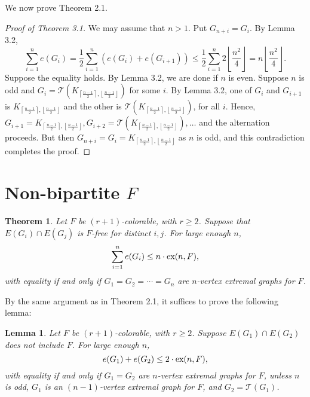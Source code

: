 \documentclass[12pt]{report}
\newtheorem{theorem}{Theorem}[chapter]
\newtheorem{lemma}{Lemma}[theorem]
\begin{document}
We now prove Theorem 2.1.

\begin{proof}[Proof of Theorem 3.1]
  We may assume that $n > 1$. Put $G_{n + i} = G_i$. By Lemma 3.2,
  \[
    \sum_{i = 1}^n e(G_i) = \frac{1}{2}\sum_{i = 1}^n (e(G_i) + e(G_{i + 1})) \leq \frac{1}{2}\sum_{i = 1}^n 2\left\lfloor\frac{n^2}{4}\right\rfloor = n\left\lfloor\frac{n^2}{4}\right\rfloor.
  \]
  Suppose the equality holds. By Lemma 3.2, we are done if $n$ is even. Suppose $n$ is odd and $G_i
   = \mathcal{T}(K_{\left\lceil\frac{n - 1}{2}\right\rceil, \left\lfloor\frac{n -
   1}{2}\right\rfloor})$ for some $i$. By Lemma 3.2, one of $G_i$ and $G_{i + 1}$ is
   $K_{\left\lceil\frac{n - 1}{2}\right\rceil, \left\lfloor\frac{n - 1}{2}\right\rfloor}$ and the
   other is $\mathcal{T}(K_{\left\lceil\frac{n - 1}{2}\right\rceil, \left\lfloor\frac{n -
   1}{2}\right\rfloor})$, for all $i$. Hence, $G_{i + 1} = K_{\left\lceil\frac{n -
   1}{2}\right\rceil, \left\lfloor\frac{n - 1}{2}\right\rfloor}, G_{i + 2} =
   \mathcal{T}(K_{\left\lceil\frac{n - 1}{2}\right\rceil, \left\lfloor\frac{n -
   1}{2}\right\rfloor}), \ldots$ and the alternation proceeds. But then $G_{n + i} = G_i =
   K_{\left\lceil\frac{n - 1}{2}\right\rceil, \left\lfloor\frac{n - 1}{2}\right\rfloor}$ as $n$ is
   odd, and this contradiction completes the proof.
\end{proof}

\section{Non-bipartite $F$}

\begin{theorem}
  Let $F$ be $(r + 1)$-colorable, with $r \geq 2$. Suppose that $E(G_i) \cap E(G_j)$ is $F$-free for
  distinct $i, j$. For large enough $n$,
  \[
    \sum_{i = 1}^n e(G_i) \leq n \cdot \textnormal{ex}(n, F),
  \]
  with equality if and only if $G_1 = G_2 = \cdots = G_n$ are $n$-vertex extremal graphs for $F$.
\end{theorem}

By the same argument as in Theorem 2.1, it suffices to prove the following lemma:

\begin{lemma}
  Let $F$ be $(r + 1)$-colorable, with $r \geq 2$. Suppose $E(G_1) \cap E(G_2)$ does not include
  $F$. For large enough $n$,
  \[
    e(G_1) + e(G_2) \leq 2 \cdot \textnormal{ex}(n, F),
  \]
  with equality if and only if $G_1 = G_2$ are $n$-vertex extremal graphs for $F$, unless $n$ is
  odd, $G_1$ is an $(n - 1)$-vertex extremal graph for $F$, and $G_2 = \mathcal{T}(G_1)$. 
\end{lemma}
\end{document}
